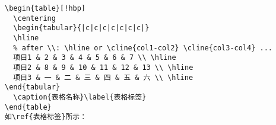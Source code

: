 \documentclass[10pt,onecolumn,a4paper]{article}
\begin{document}
\begin{mdframed}[backgroundcolor=mycolor,hidealllines=true]
\begin{verbatim}
\begin{table}[!hbp]
  \centering
  \begin{tabular}{|c|c|c|c|c|c|c|}
  \hline
  % after \\: \hline or \cline{col1-col2} \cline{col3-col4} ...
  项目1 & 2 & 3 & 4 & 5 & 6 & 7 \\ \hline
  项目2 & 8 & 9 & 10 & 11 & 12 & 13 \\ \hline
  项目3 & 一 & 二 & 三 & 四 & 五 & 六 \\ \hline
\end{tabular}
  \caption{表格名称}\label{表格标签}
\end{table}
如\ref{表格标签}所示：
\end{verbatim}
\end{mdframed}
\end{document}
